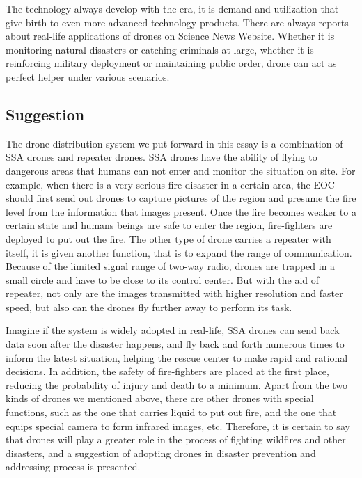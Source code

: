 \documentclass{mcmthesis}
\begin{document}
The technology always develop with the era, it is demand and utilization that give birth to even more advanced technology products. There are always reports about real-life applications of drones on Science News Website. Whether it is monitoring natural disasters or catching criminals at large, whether it is reinforcing military deployment or maintaining public order, drone can act as perfect helper under various scenarios.

\subsection{Suggestion}
The drone distribution system we put forward in this essay is a combination of SSA drones and repeater drones. SSA drones have the ability of flying to dangerous areas that humans can not enter and monitor the situation on site. For example, when there is a very serious fire disaster in a certain area, the EOC should first send out drones to capture pictures of the region and presume the fire level from the information that images present. Once the fire becomes weaker to a certain state and humans beings are safe to enter the region, fire-fighters are deployed to put out the fire. The other type of drone carries a repeater with itself, it is given another function, that is to expand the range of communication. Because of the limited signal range of two-way radio, drones are trapped in a small circle and have to be close to its control center. But with the aid of repeater, not only are the images transmitted with higher resolution and faster speed, but also can the drones fly further away to perform its task. 

Imagine if the system is widely adopted in real-life, SSA drones can send back data soon after the disaster happens, and fly back and forth numerous times to inform the latest situation, helping the rescue center to make rapid and rational decisions. In addition, the safety of fire-fighters are placed at the first place, reducing the probability of injury and death to a minimum. Apart from the two kinds of drones we mentioned above, there are other drones with special functions, such as the one that carries liquid to put out fire, and the one that equips special camera to form infrared images, etc. Therefore, it is certain to say that drones will play a greater role in the process of fighting wildfires and other disasters, and a suggestion of adopting drones in disaster prevention and addressing process is presented.
\end{document}
